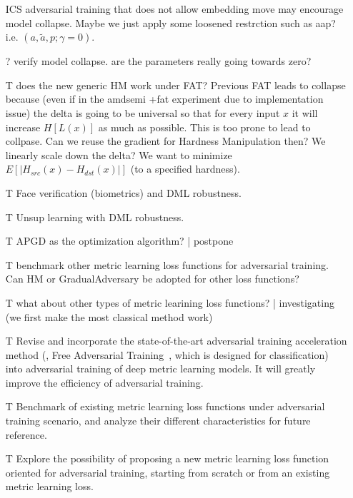 \begin{itemize}
	\item [ICS] adversarial training that does not allow embedding move may
		encourage model collapse. Maybe we just apply some loosened restrction
		such as aap? i.e. $(a,\tilde{a},p;\gamma=0)$.

	\item [?] verify model collapse. are the parameters really going towards zero?

	\item [T] does the new generic HM work under FAT?
		Previous FAT leads to collapse because (even if in the amdsemi +fat
		experiment due to implementation issue) the delta is going to be universal
		so that for every input $x$ it will increase $H[L(x)]$ as much as possible.
		This is too prone to lead to collpase. Can we reuse the gradient for 
		Hardness Manipulation then? We linearly scale down the delta?
		We want to minimize $E[|H_{src}(x)-H_{dst}(x)|]$ (to a specified hardness).

	\item [T] Face verification (biometrics) and DML robustness.

	\item [T] Unsup learning with DML robustness.

	\item [T] APGD as the optimization algorithm? | postpone

	\item [T] benchmark other metric learning loss functions for adversarial
		training. Can HM or GradualAdversary be adopted for other loss functions?

	\item [T]  what about other types of metric learining loss functions? |
		investigating (we first make the most classical method work)

	\item [T] Revise and incorporate the state-of-the-art adversarial training
		acceleration method (\ie, Free Adversarial Training~\cite{freeat},
		which is designed for classification) into adversarial training of 
		deep metric learning models. It will greatly improve the efficiency
		of adversarial training.
	\item [T] Benchmark of existing metric learning loss functions under
		adversarial training scenario, and analyze their different
		characteristics for future reference.
	\item [T] Explore the possibility of proposing a new metric learning loss
		function oriented for adversarial training, starting from scratch or
		from an existing metric learning loss.
\end{itemize}


